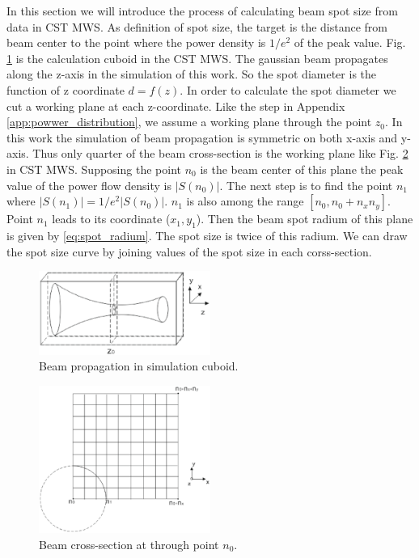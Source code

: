 In this section we will introduce the process of calculating beam spot size from data in CST MWS. As definition of spot size, the target is the distance from beam center to the point where the power density is $1/e^{2}$ of the peak value.  Fig. \ref{Afig:beam_cuboid} is the calculation cuboid in the CST MWS. The gaussian beam propagates along the z-axis in the simulation of this work. So the spot diameter is the function of z coordinate $d=f(z)$. In order to calculate the spot diameter we cut a working plane at each z-coordinate. Like the step in Appendix \ref{app:powwer_distribution}, we assume a working plane through the point $z_{0}$. In this work the simulation of beam propagation is symmetric on both x-axis and y-axis. Thus only quarter of the beam cross-section is the working plane like Fig. \ref{Afig:beam_crosssection} in CST MWS. Supposing the point $n_{0}$ is the beam center of this plane the peak value of the power flow density is $|S(n_{0})|$. The next step is to find the point $n_{1}$ where $|S(n_{1})|=1/e^{2}|S(n_{0})|$. $n_{1}$ is also among the range $[n_{0}, n_{0}+n_{x}n_{y}]$. Point $n_{1}$ leads to its coordinate ($x_{1},y_{1}$). Then the beam spot radium of this plane is given by \ref{eq:spot_radium}. The spot size is twice of this radium. We can draw the spot size curve by joining values of the spot size in each corss-section.
\begin{figure}[!ht]
\centering
\includegraphics[width=0.5\textwidth]{bilder/beam_cuboid}
\caption{Beam propagation in simulation cuboid.}
\label{Afig:beam_cuboid}
\end{figure}
\begin{figure}[!ht]
\centering
\includegraphics[width=0.5\textwidth]{bilder/beam_crosssection}
\caption{Beam cross-section at through point $n_{0}$.}
\label{Afig:beam_crosssection}
\end{figure}
